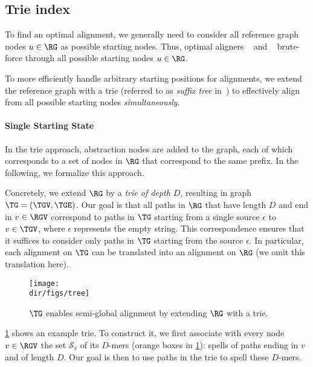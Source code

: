\subsection{Trie index} \label{TRIEsubsec:trie}

To find an optimal alignment, we generally need to consider all reference graph
nodes $u \in \RG$ as possible starting nodes. Thus, optimal aligners
\pasgal~\cite{jain_accelerating_2019} and
\bitparallel~\cite{rautiainen_bitparallel_2019} brute-force through all
possible starting nodes $u \in \RG$.

To more efficiently handle arbitrary starting positions for alignments, we
extend the reference graph with a trie (referred to as \emph{suffix tree}
in~\cite{dox2018efficient}) to effectively align from all possible starting
nodes \emph{simultaneously}.

\paragraph{Single Starting State}
In the trie approach, abstraction nodes are added to the graph, each of which
corresponds to a set of nodes in $\RG$ that correspond to the same prefix. In
the following, we formalize this approach.

Concretely, we extend $\RG$ by a \emph{trie of depth $D$}, resulting in graph
$\TG=(\TGV,\TGE)$. Our goal is that all paths in $\RG$ that have length $D$ and
end in $v \in \RGV$ correspond to paths in $\TG$ starting from a single source
$\epsilon$ to $v \in \TGV$, where $\epsilon$ represents the empty string. This
correspondence ensures that it suffices to consider only paths in $\TG$ starting
from the source $\epsilon$. In particular, each alignment on $\TG$ can
be translated into an alignment on $\RG$ (we omit this translation
here).

\begin{figure}[H]
	\centering
	\texttt{[image: \\dir/figs/tree]}
	\caption[Indexing the reference with a trie]{$\TG$ enables semi-global alignment by extending $\RG$ with a trie.}
	\label{TRIEfig:trie}
\end{figure}

\cref{TRIEfig:trie} shows an example trie. To construct it, we first associate with
every node $v \in \RGV$ the set $\mathcal{S}_v$ of its $D$-mers (orange boxes in
\cref{TRIEfig:trie}): spells of paths ending in $v$ and of length $D$. Our goal is
then to use paths in the trie to spell these $D$-mers.


